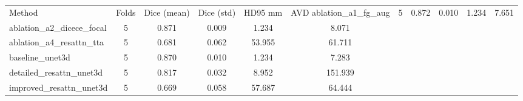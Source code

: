 \begin{tabular}{lccccc}
\toprule
Method & Folds & Dice (mean) & Dice (std) & HD95 mm & AVD %
\midrule
ablation\_a1\_fg\_aug & 5 & 0.872 & 0.010 & 1.234 & 7.651 \\
ablation\_a2\_dicece\_focal & 5 & 0.871 & 0.009 & 1.234 & 8.071 \\
ablation\_a4\_resattn\_tta & 5 & 0.681 & 0.062 & 53.955 & 61.711 \\
baseline\_unet3d & 5 & 0.870 & 0.010 & 1.234 & 7.283 \\
detailed\_resattn\_unet3d & 5 & 0.817 & 0.032 & 8.952 & 151.939 \\
improved\_resattn\_unet3d & 5 & 0.669 & 0.058 & 57.687 & 64.444 \\
\bottomrule
\end{tabular}
